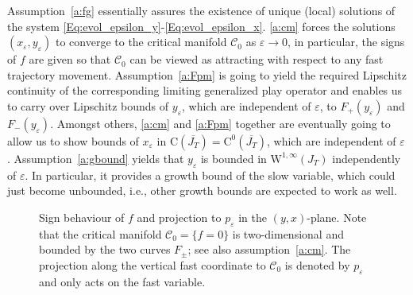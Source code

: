 \documentclass[12pt]{article}
\newcommand{\cC}{{\mathcal C}}  %
\begin{document}
Assumption~\ref{a:fg} essentially assures the existence of unique (local) solutions 
of the system \eqref{Eq:evol_epsilon_y}-\eqref{Eq:evol_epsilon_x}. \ref{a:cm} forces 
the solutions $(x_\varepsilon,y_\varepsilon)$ to converge to the critical manifold 
$\cC_0$ as $\varepsilon\rightarrow 0$, in particular, the signs of $f$ are given so
that $\cC_0$ can be viewed as attracting with respect to any fast trajectory movement. 
Assumption~\ref{a:Fpm} is going to yield the required Lipschitz continuity of the 
corresponding limiting generalized play operator and enables us to carry over Lipschitz 
bounds of $y_\varepsilon$, which are independent of $\varepsilon$, to $F_+(y_\varepsilon)$ 
and $F_-(y_\varepsilon)$. Amongst others, \ref{a:cm} and \ref{a:Fpm} together are 
eventually going to allow us to show bounds of $x_\varepsilon$ in 
$\mathrm{C}(\overline{J_T})=\mathrm{C}^0(\overline{J_T})$, which are independent 
of $\varepsilon$. Assumption~\ref{a:gbound} yields that $y_\varepsilon$ is bounded in 
$\mathrm{W}^{1,\infty}(J_T)$ independently of $\varepsilon$. In particular, it provides
a growth bound of the slow variable, which could just become unbounded, i.e., other 
growth bounds are expected to work as well.\medskip

\begin{figure}
\center
{}
\caption{Sign behaviour of $f$ and projection to $p_\varepsilon$ in the $(y,x)$-plane.
Note that the critical manifold $\cC_0=\{f=0\}$ is two-dimensional and bounded by the 
two curves $F_\pm$; see also assumption~\ref{a:cm}. The projection along the vertical
fast coordinate to $\cC_0$ is denoted by $p_\varepsilon$ and only acts on the fast 
variable.}
\label{fig:04}
\end{figure}
\end{document}
